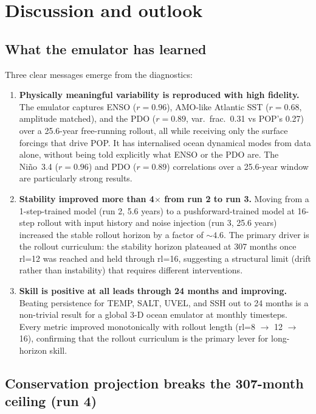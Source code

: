\documentclass[11pt]{article}
\begin{document}
\section{Discussion and outlook}
\label{sec:discussion}

\subsection{What the emulator has learned}
Three clear messages emerge from the diagnostics:

\begin{enumerate}
\item \textbf{Physically meaningful variability is reproduced with high fidelity.}
  The emulator captures ENSO ($r=0.96$), AMO-like Atlantic SST ($r=0.68$, amplitude
  matched), and the PDO ($r=0.89$, var.\ frac.\ 0.31 vs POP's 0.27) over a
  25.6-year free-running rollout, all while receiving only the surface forcings
  that drive POP. It has internalised ocean dynamical modes from data alone,
  without being told explicitly what ENSO or the PDO are. The Ni\~no~3.4 ($r=0.96$)
  and PDO ($r=0.89$) correlations over a 25.6-year window are particularly strong results.

\item \textbf{Stability improved more than 4$\times$ from run 2 to run 3.}
  Moving from a 1-step-trained model (run 2, 5.6 years) to a pushforward-trained
  model at 16-step rollout with input history and noise injection (run 3, 25.6 years)
  increased the stable rollout horizon by a factor of $\sim4.6$. The primary
  driver is the rollout curriculum: the stability horizon plateaued at 307 months
  once rl=12 was reached and held through rl=16, suggesting a structural limit
  (drift rather than instability) that requires different interventions.

\item \textbf{Skill is positive at all leads through 24 months and improving.}
  Beating persistence for TEMP, SALT, UVEL, and SSH out to 24 months is a
  non-trivial result for a global 3-D ocean emulator at monthly timesteps.
  Every metric improved monotonically with rollout length (rl=8 $\to$ 12 $\to$ 16),
  confirming that the rollout curriculum is the primary lever for long-horizon skill.
\end{enumerate}

\subsection{Conservation projection breaks the 307-month ceiling (run 4)}
\end{document}
